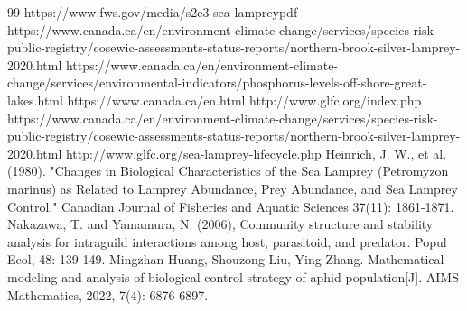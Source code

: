 \documentclass{mcmthesis}
\begin{document}
\newpage
\begin{thebibliography}{99}
  https://www.fws.gov/media/s2e3-sea-lampreypdf
  https://www.canada.ca/en/environment-climate-change/services/species-risk-public-registry/cosewic-assessments-status-reports/northern-brook-silver-lamprey-2020.html
  https://www.canada.ca/en/environment-climate-change/services/environmental-indicators/phosphorus-levels-off-shore-great-lakes.html
  https://www.canada.ca/en.html
  http://www.glfc.org/index.php
  https://www.canada.ca/en/environment-climate-change/services/species-risk-public-registry/cosewic-assessments-status-reports/northern-brook-silver-lamprey-2020.html
  http://www.glfc.org/sea-lamprey-lifecycle.php
  Heinrich, J. W., et al. (1980). "Changes in Biological Characteristics of the Sea Lamprey (Petromyzon marinus) as Related to Lamprey Abundance, Prey Abundance, and Sea Lamprey Control." Canadian Journal of Fisheries and Aquatic Sciences 37(11): 1861-1871.
  Nakazawa, T. and Yamamura, N. (2006), Community structure and stability analysis for intraguild interactions among host, parasitoid, and predator. Popul Ecol, 48: 139-149.
  Mingzhan Huang, Shouzong Liu, Ying Zhang. Mathematical modeling and analysis of biological control strategy of aphid population[J]. AIMS Mathematics, 2022, 7(4): 6876-6897.
\end{thebibliography}
\newpage
\end{document}
